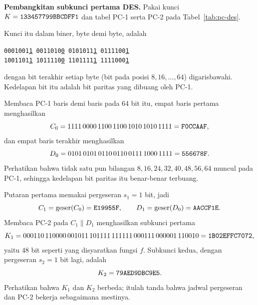 \begin{example}
\label{ex:des-subkunci}
\textbf{Pembangkitan subkunci pertama DES.} Pakai kunci
$K = \texttt{133457799BBCDFF1}$ dan tabel PC-1 serta PC-2 pada
Tabel~\ref{tab:pc-des}.

Kunci itu dalam biner, byte demi byte, adalah
\begin{center}
\texttt{0001001\underline{1}\ 0011010\underline{0}\ 0101011\underline{1}\ 0111100\underline{1}}\\
\texttt{1001101\underline{1}\ 1011110\underline{0}\ 1101111\underline{1}\ 1111000\underline{1}}
\end{center}
dengan bit terakhir setiap byte (bit pada posisi $8, 16, \dots, 64$)
digarisbawahi. Kedelapan bit itu adalah bit paritas yang dibuang oleh PC-1.

Membaca PC-1 baris demi baris pada 64 bit itu, empat baris pertama menghasilkan
\[
C_0 = 1111\,0000\,1100\,1100\,1010\,1010\,1111 = \texttt{F0CCAAF},
\]
dan empat baris terakhir menghasilkan
\[
D_0 = 0101\,0101\,0110\,0110\,0111\,1000\,1111 = \texttt{556678F}.
\]
Perhatikan bahwa tidak satu pun bilangan $8, 16, 24, 32, 40, 48, 56, 64$ muncul
pada PC-1, sehingga kedelapan bit paritas itu benar-benar terbuang.

Putaran pertama memakai pergeseran $s_1 = 1$ bit, jadi
\[
C_1 = \text{geser}(C_0) = \texttt{E19955F}, \qquad
D_1 = \text{geser}(D_0) = \texttt{AACCF1E}.
\]
Membaca PC-2 pada $C_1 \parallel D_1$ menghasilkan subkunci pertama
\[
K_1 = 000110\,110000\,001011\,101111\,111111\,000111\,000001\,110010 = \texttt{1B02EFFC7072},
\]
yaitu 48 bit seperti yang disyaratkan fungsi $f$. Subkunci kedua, dengan
pergeseran $s_2 = 1$ bit lagi, adalah
\[
K_2 = \texttt{79AED9DBC9E5}.
\]
Perhatikan bahwa $K_1$ dan $K_2$ berbeda; itulah tanda bahwa jadwal pergeseran
dan PC-2 bekerja sebagaimana mestinya.
\end{example}


